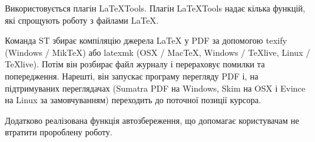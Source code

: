 Використовується плагін LaTeXTools. Плагін LaTeXTools надає кілька функцій, які спрощують роботу з файлами LaTeX.

Команда ST збирає компіляцію джерела LaTeX у PDF за допомогою texify (Windows / MikTeX) або latexmk (OSX / MacTeX, Windows / TeXlive, Linux / TeXlive). Потім він розбирає файл журналу і перераховує помилки та попередження. Нарешті, він запускає програму перегляду PDF і, на підтримуваних переглядачах (Sumatra PDF на Windows, Skim на OSX і Evince на Linux за замовчуванням) переходить до поточної позиції курсора.

Додатково реалізована функція автозбереження, що допомагає користувачам не втратити пророблену роботу.

